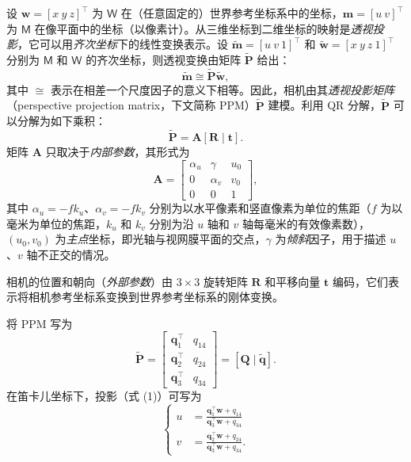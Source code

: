\documentclass[a4paper,twocolumn,zihao=5,fontset=none,UTF8]{ctexart}
\newcommand{\bP}{\widetilde{\mathbf{P}}}
\newcommand{\Q}{\mathbf{Q}}
\newcommand{\tq}{\widetilde{\mathbf{q}}}
\newcommand{\A}{\mathbf{A}}
\newcommand{\R}{\mathbf{R}}
\newcommand{\tv}{\mathbf{t}}
\newcommand{\w}{\mathbf{w}}
\newcommand{\tm}{\widetilde{\mathbf{m}}}
\newcommand{\tw}{\widetilde{\mathbf{w}}}
\newcommand{\pt}[1]{\mathsf{#1}}
\begin{document}
设 $\w=[x\ y\ z]^\top$ 为 $\pt{W}$ 在（任意固定的）世界参考坐标系中的坐标，$\mathbf{m}=[u\ v]^\top$ 为 $\pt{M}$ 在像平面中的坐标（以像素计）。从三维坐标到二维坐标的映射是\emph{透视投影}，它可以用\emph{齐次坐标}下的线性变换表示。设 $\tm=[u\ v\ 1]^\top$ 和 $\tw=[x\ y\ z\ 1]^\top$ 分别为 $\pt{M}$ 和 $\pt{W}$ 的齐次坐标，则透视变换由矩阵 $\bP$ 给出：
\begin{equation}
  \tm\cong\bP\tw,
\end{equation}
其中 $\cong$ 表示在相差一个尺度因子的意义下相等。因此，相机由其\emph{透视投影矩阵}（perspective projection matrix，下文简称 PPM）$\bP$ 建模。利用 QR 分解，$\bP$ 可以分解为如下乘积：
\begin{equation}
  \bP=\A[\R\mid\tv].
\end{equation}
矩阵 $\A$ 只取决于\emph{内部参数}，其形式为
\begin{equation}
  \A=\begin{bmatrix}\alpha_u & \gamma & u_0\\ 0 & \alpha_v & v_0\\ 0 & 0 & 1\end{bmatrix},
\end{equation}
其中 $\alpha_u=-fk_u$、$\alpha_v=-fk_v$ 分别为以水平像素和竖直像素为单位的焦距（$f$ 为以毫米为单位的焦距，$k_u$ 和 $k_v$ 分别为沿 $u$ 轴和 $v$ 轴每毫米的有效像素数），$(u_0,v_0)$ 为\emph{主点}坐标，即光轴与视网膜平面的交点，$\gamma$ 为\emph{倾斜}因子，用于描述 $u$、$v$ 轴不正交的情况。

相机的位置和朝向（\emph{外部参数}）由 $3\times3$ 旋转矩阵 $\R$ 和平移向量 $\tv$ 编码，它们表示将相机参考坐标系变换到世界参考坐标系的刚体变换。

将 PPM 写为
\begin{equation}
  \bP=\left[\begin{array}{c|c}\mathbf{q}_1^\top & q_{14}\\ \mathbf{q}_2^\top & q_{24}\\ \mathbf{q}_3^\top & q_{34}\end{array}\right]=[\Q\mid\tq].
\end{equation}
在笛卡儿坐标下，投影（式 (1)）可写为
\begin{equation}
  \left\{\begin{aligned}
    u&=\frac{\mathbf{q}_1^\top\w+q_{14}}{\mathbf{q}_3^\top\w+q_{34}}\\[2pt]
    v&=\frac{\mathbf{q}_2^\top\w+q_{24}}{\mathbf{q}_3^\top\w+q_{34}}.
  \end{aligned}\right.
\end{equation}
\end{document}
